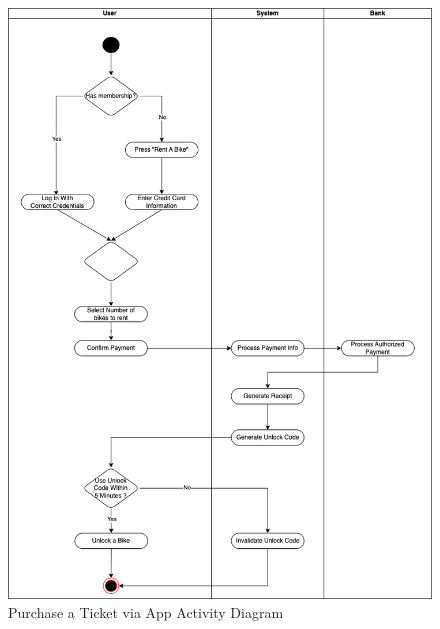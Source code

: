 \begin{figure}[H]
  \centering
  \includegraphics[scale = 0.60]{images/PurchaseTicketViaApp.png}
  \caption{Purchase a Ticket via App Activity Diagram}
  \label{fig:Purchase a Ticket via app Activity Diagram}
\end{figure}

